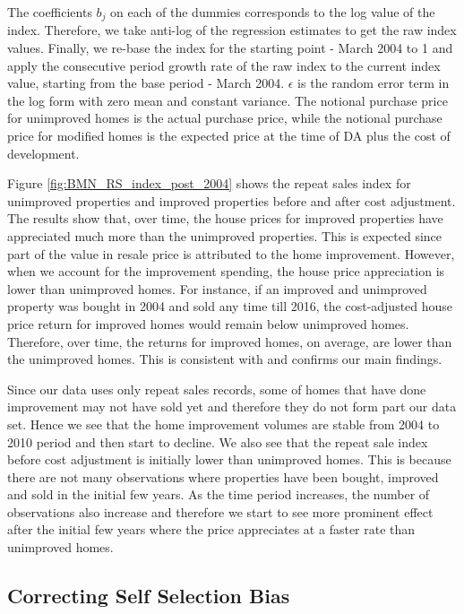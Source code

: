 \documentclass[AEJ,reqno, draftmode]{AEA} %
\begin{document}
The coefficients $b_j$ on each of the dummies corresponds to the log value of the index. Therefore, we take anti-log of the regression estimates to get the raw index values. Finally, we re-base the index for the starting point - March 2004 to 1 and apply the consecutive period growth rate of the raw index to the current index value, starting from the base period - March 2004.  $\epsilon$ is the random error term in the log form with zero mean and constant variance. The notional purchase price for unimproved homes is the actual purchase price, while the notional purchase price for modified homes is the expected price at the time of DA plus the cost of development. 

%
Figure \ref{fig:BMN_RS_index_post_2004} shows the repeat sales index for unimproved properties and improved properties before and after cost adjustment. The results show that, over time, the house prices for improved properties have appreciated much more than the unimproved properties. This is expected since part of the value in resale price is attributed to the home improvement. However, when we account for the improvement spending, the house price appreciation is lower than unimproved homes. For instance, if an improved and unimproved property was bought in 2004 and sold any time till 2016, the cost-adjusted house price return for improved homes would remain below unimproved homes. Therefore, over time, the returns for improved homes, on average, are lower than the unimproved homes. This is consistent with and confirms our main findings.

Since our data uses only repeat sales records, some of homes that have done improvement may not have sold yet and therefore they do not form part our data set. Hence we see that the home improvement volumes are stable from 2004 to 2010 period and then start to decline. We also see that the repeat sale index before cost adjustment is initially lower than unimproved homes. This is because there are not many observations where properties have been bought, improved and sold in the initial few years. As the time period increases, the number of observations also increase and therefore we start to see more prominent effect after the initial few years where the price appreciates at a faster rate than unimproved homes.


\subsection{Correcting Self Selection Bias}
\end{document}
